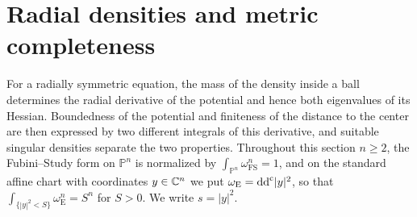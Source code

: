 \section{Radial densities and metric completeness}\label{sec:radial}

For a radially symmetric equation, the mass of the density inside a ball determines the radial derivative of the potential and hence both eigenvalues of its Hessian. Boundedness of the potential and finiteness of the distance to the center are then expressed by two different integrals of this derivative, and suitable singular densities separate the two properties. Throughout this section $n\geq2$, the Fubini--Study form on $\mathbb P^n$ is normalized by $\int_{\mathbb P^n}\omega_{\mathrm{FS}}^n=1$, and on the standard affine chart with coordinates $y\in\mathbb C^n$ we put $\omega_{\mathrm E}=\mathrm{dd}^{\mathrm{c}}|y|^2$, so that $\int_{\{|y|^2<S\}}\omega_{\mathrm E}^n=S^n$ for $S>0$. We write $s=|y|^2$.

